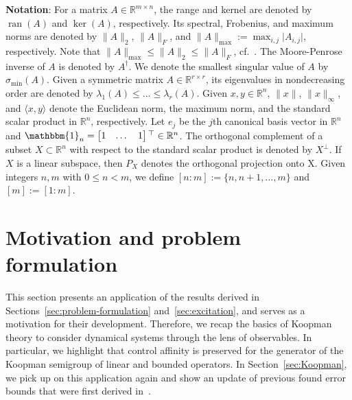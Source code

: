 \documentclass[a4paper, reqno]{amsart}
\begin{document}
\textbf{Notation}: For a matrix $A \in \mathbb R^{m\times n}$, the range and kernel are denoted by $\operatorname{ran}(A)$ and $\operatorname{ker}(A)$, respectively. 
Its spectral, Frobenius, and maximum norms are denoted by $\lVert A\rVert_2$, $\lVert A\rVert_F$, and $\lVert A\rVert_\mathrm{max}:=\max_{i,j} \lvert A_{i,j}\rvert$, respectively. Note that $\lVert A\rVert_\mathrm{max}\leq \lVert A\rVert_2\leq \lVert A\rVert_F$, cf.\ \cite[p.~56]{golub2013matrix}. The Moore-Penrose inverse of $A$ is denoted by $A^\dagger$. We denote the smallest singular value of $A$ by $\sigma_\mathrm{min}(A)$. Given a symmetric matrix $A\in \mathbb R^{r\times r}$, its eigenvalues in nondecreasing order are denoted by $\lambda_1(A)\leq\dots \leq \lambda_r(A)$. Given $x,y\in\mathbb R^n$, $\lVert x\rVert$, $\lVert x\rVert_\infty$, and $\langle x,y\rangle$ denote the Euclidean norm, the maximum norm, and the standard scalar product in $\mathbb R^n$, respectively. 
Let $e_j$ be the $j$th canonical basis vector in $\mathbb R^n$ and $\mathbbm{1}_n = \begin{bmatrix}1 & \dots & 1\end{bmatrix}{}^\top \in\mathbb R^n$. The orthogonal complement of a subset $X\subset\mathbb R^n$ with respect to the standard scalar product is denoted by $X^\bot$. If $X$ is a linear subspace, then $P_X$ denotes the orthogonal projection onto X. Given integers $n,m$ with $0\leq n<m$, we define $[n:m]:=\{n, n+1,\dots, m\}$ and $[m]:=[1:m]$.



\section{Motivation and problem formulation}

This section presents an application of the results derived in Sections~\ref{sec:problem-formulation} and~\ref{sec:excitation}, and serves as a motivation for their development. Therefore, we recap the basics of Koopman theory to consider dynamical systems through the lens of observables. In particular, we highlight that control affinity is preserved for the generator of the Koopman semigroup of linear and bounded operators.
In Section~\ref{sec:Koopman}, we pick up on this application again and show an update of previous found error bounds that were first derived in~\cite{BoldPhil24}.
\end{document}

